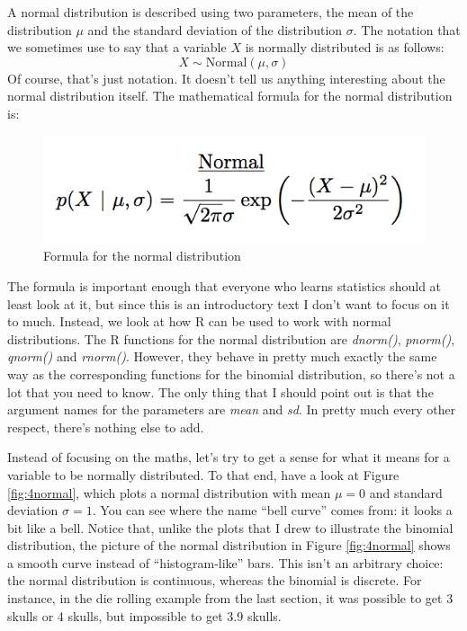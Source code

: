 \documentclass[]{book}
\begin{document}
A normal distribution is described using two parameters, the mean of the distribution \(\mu\) and the standard deviation of the distribution \(\sigma\). The notation that we sometimes use to say that a variable \(X\) is normally distributed is as follows: \[X \sim \mbox{Normal}(\mu,\sigma)\] Of course, that's just notation. It doesn't tell us anything interesting about the normal distribution itself. The mathematical formula for the normal distribution is:

\begin{figure}
\centering
\includegraphics{navarro_img/probability/Normal_formula.png}
\caption{\label{fig:4normalformula}Formula for the normal distribution}
\end{figure}

The formula is important enough that everyone who learns statistics should at least look at it, but since this is an introductory text I don't want to focus on it to much. Instead, we look at how R can be used to work with normal distributions. The R functions for the normal distribution are \emph{dnorm()}, \emph{pnorm()}, \emph{qnorm()} and \emph{rnorm()}. However, they behave in pretty much exactly the same way as the corresponding functions for the binomial distribution, so there's not a lot that you need to know. The only thing that I should point out is that the argument names for the parameters are \emph{mean} and \emph{sd}. In pretty much every other respect, there's nothing else to add.

Instead of focusing on the maths, let's try to get a sense for what it means for a variable to be normally distributed. To that end, have a look at Figure \ref{fig:4normal}, which plots a normal distribution with mean \(\mu = 0\) and standard deviation \(\sigma = 1\). You can see where the name ``bell curve'' comes from: it looks a bit like a bell. Notice that, unlike the plots that I drew to illustrate the binomial distribution, the picture of the normal distribution in Figure \ref{fig:4normal} shows a smooth curve instead of ``histogram-like'' bars. This isn't an arbitrary choice: the normal distribution is continuous, whereas the binomial is discrete. For instance, in the die rolling example from the last section, it was possible to get 3 skulls or 4 skulls, but impossible to get 3.9 skulls.
\end{document}
